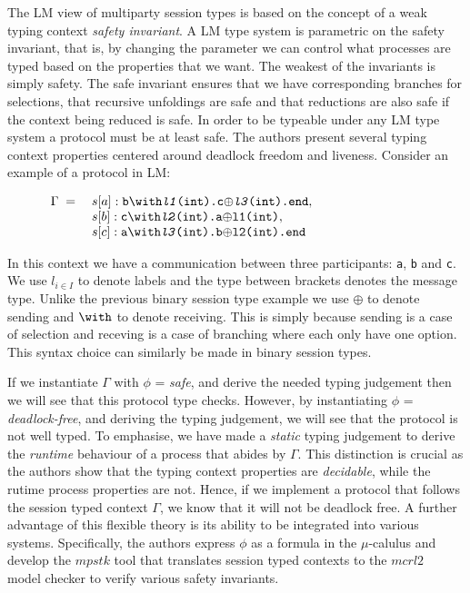 \documentclass{article}
\newcommand{\type}[1]{\texttt{#1}}
\begin{document}
The LM view of multiparty session types is based on the concept of a weak typing context \textit{safety invariant}.
A LM type system is parametric on the safety invariant, that is, by changing the parameter we can control what processes are typed based on the properties that we want.
The weakest of the invariants is simply safety.
The safe invariant ensures that we have corresponding branches for selections, that recursive unfoldings are safe and that reductions are also safe if the context being reduced is safe.
In order to be typeable under any LM type system a protocol must be at least safe.
The authors present several typing context properties centered around deadlock freedom and liveness.
Consider an example of a protocol in LM:

\begin{figure}[H]
    \centering
$
    \begin{array}{rl}
        \textbf{\ensuremath{\Gamma}} \; = \;  & s[a]:\type{b\ensuremath{\with}\textit{l1}(int).c\ensuremath{\oplus}\textit{l3}(int).end}, \cr
        & s[b]:\type{c\ensuremath{\with}\textit{l2}(int).a\ensuremath{\oplus}l1(int)}, \cr
        & s[c]:\type{a\ensuremath{\with}\textit{l3}(int).b\ensuremath{\oplus}l2(int).end}
    \end{array}
$
\end{figure}

In this context we have a communication between three participants: \type{a}, \type{b} and \type{c}.
We use \ensuremath{l_{i \in I}} to denote labels and the type between brackets denotes the message type.
Unlike the previous binary session type example we use \type{\ensuremath{\oplus}} to denote sending and \type{\ensuremath{\with}} to denote receiving.
This is simply because sending is a case of selection and receving is a case of branching where each only have one option.
This syntax choice can similarly be made in binary session types.

If we instantiate \type{\ensuremath{\Gamma}} with \type{\ensuremath{\phi}} = \textit{safe}, and derive the needed typing judgement then we will see that this protocol type checks.
However, by instantiating \type{\ensuremath{\phi}} = \textit{deadlock-free}, and deriving the typing judgement, we will see that the protocol is not well typed. To emphasise, we have made a \textit{static} typing judgement to derive the \textit{runtime} behaviour of a process that abides by \type{\ensuremath{\Gamma}}.
This distinction is crucial as the authors show that the typing context properties are \textit{decidable}, while the rutime process properties are not.
Hence, if we implement a protocol that follows the session typed context \type{\ensuremath{\Gamma}}, we know that it will not be deadlock free.
A further advantage of this flexible theory is its ability to be integrated into various systems.
Specifically, the authors express \type{\ensuremath{\phi}} as a formula in the \type{\ensuremath{\mu}}-calulus and develop the \ensuremath{mpstk} tool that translates session typed contexts to the \ensuremath{mcrl2}~\cite{todo} model checker to verify various safety invariants.
\end{document}
